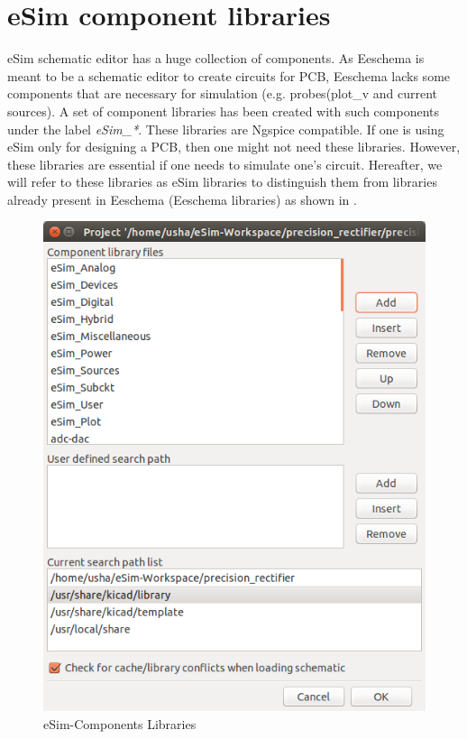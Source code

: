 \section{eSim component libraries}%

eSim schematic editor has a huge collection of components. As Eeschema is  meant  to  be  a  schematic  editor  to  create  circuits  for  PCB,  Eeschema  lacks  some components that are necessary for simulation (e.g.  probes(plot\_v and current sources). A set of component libraries has been created with such components under the label \textit{eSim\_*}. These libraries are Ngspice compatible.  If one is using eSim only  for  designing  a  PCB,  then  one  might  not  need  these  libraries. However, these libraries are essential if one needs to simulate one's circuit. Hereafter, we will refer to these libraries as eSim libraries to distinguish them from libraries already present in Eeschema (Eeschema libraries) as shown in .
\begin{figure}[h]
\centering
\includegraphics[width=\smfig]{manual_images/libraries.png}
\caption{eSim-Components Libraries}
\label{libraries}
\end{figure}

